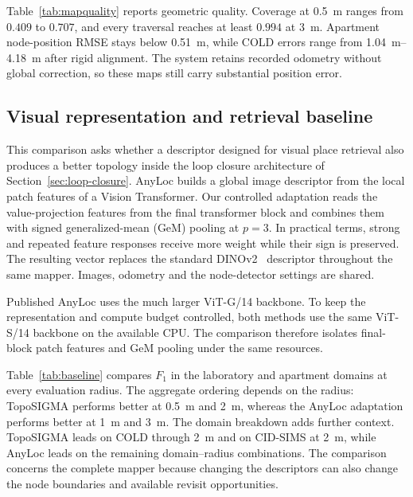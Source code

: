 \documentclass[5p,twocolumn,nonatbib,reversenotenum]{elsarticle}
\newcommand{\methodname}{TopoSIGMA\xspace}
\begin{document}
Table~\ref{tab:mapquality} reports geometric quality. Coverage at \qty{0.5}{\metre} ranges from $0.409$ to $0.707$, and every traversal reaches at least $0.994$ at \qty{3}{\metre}. Apartment node-position RMSE stays below \qty{0.51}{\metre}, while COLD errors range from \qtyrange{1.04}{4.18}{\metre} after rigid alignment. The system retains recorded odometry without global correction, so these maps still carry substantial position error.

\subsection{Visual representation and retrieval baseline}
This comparison asks whether a descriptor designed for visual place retrieval also produces a better topology inside the loop closure architecture of Section~\ref{sec:loop-closure}. AnyLoc builds a global image descriptor from the local patch features of a Vision Transformer. Our controlled adaptation reads the value-projection features from the final transformer block and combines them with signed generalized-mean (GeM) pooling at $p=3$. In practical terms, strong and repeated feature responses receive more weight while their sign is preserved. The resulting vector replaces the standard DINOv2~\cite{oquab2024dinov2learningrobustvisual} descriptor throughout the same mapper. Images, odometry and the node-detector settings are shared.

Published AnyLoc uses the much larger ViT-G/14 backbone. To keep the representation and compute budget controlled, both methods use the same ViT-S/14 backbone on the available CPU. The comparison therefore isolates final-block patch features and GeM pooling under the same resources.

Table~\ref{tab:baseline} compares $F_1$ in the laboratory and apartment domains at every evaluation radius. The aggregate ordering depends on the radius: \methodname performs better at \qty{0.5}{\metre} and \qty{2}{\metre}, whereas the AnyLoc adaptation performs better at \qty{1}{\metre} and \qty{3}{\metre}. The domain breakdown adds further context. \methodname leads on COLD through \qty{2}{\metre} and on CID-SIMS at \qty{2}{\metre}, while AnyLoc leads on the remaining domain--radius combinations. The comparison concerns the complete mapper because changing the descriptors can also change the node boundaries and available revisit opportunities.
\end{document}
